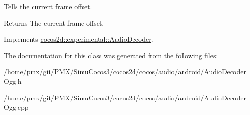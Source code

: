 Tells the current frame offset. 

\begin{DoxyReturn}{Returns}
The current frame offset. 
\end{DoxyReturn}


Implements \hyperlink{classcocos2d_1_1experimental_1_1AudioDecoder_a6c7f6cb06a8eb9e584ff6097a3f37e95}{cocos2d\+::experimental\+::\+Audio\+Decoder}.



The documentation for this class was generated from the following files\+:\begin{DoxyCompactItemize}
\item 
/home/pmx/git/\+P\+M\+X/\+Simu\+Cocos3/cocos2d/cocos/audio/android/Audio\+Decoder\+Ogg.\+h\item 
/home/pmx/git/\+P\+M\+X/\+Simu\+Cocos3/cocos2d/cocos/audio/android/Audio\+Decoder\+Ogg.\+cpp\end{DoxyCompactItemize}
